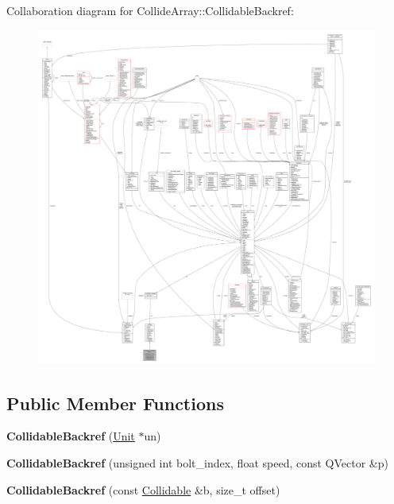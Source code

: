 Collaboration diagram for Collide\+Array\+:\+:Collidable\+Backref\+:
\nopagebreak
\begin{figure}[H]
\begin{center}
\leavevmode
\includegraphics[width=350pt]{dd/ddb/classCollideArray_1_1CollidableBackref__coll__graph}
\end{center}
\end{figure}
\subsection*{Public Member Functions}
\begin{DoxyCompactItemize}
\item 
{\bfseries Collidable\+Backref} (\hyperlink{classUnit}{Unit} $\ast$un)\hypertarget{classCollideArray_1_1CollidableBackref_a3e436b742c4233e417c14222e8cea1c3}{}\label{classCollideArray_1_1CollidableBackref_a3e436b742c4233e417c14222e8cea1c3}

\item 
{\bfseries Collidable\+Backref} (unsigned int bolt\+\_\+index, float speed, const Q\+Vector \&p)\hypertarget{classCollideArray_1_1CollidableBackref_a99de7d4c9f159bdabe5e0b1e3925b83a}{}\label{classCollideArray_1_1CollidableBackref_a99de7d4c9f159bdabe5e0b1e3925b83a}

\item 
{\bfseries Collidable\+Backref} (const \hyperlink{classCollidable}{Collidable} \&b, size\+\_\+t offset)\hypertarget{classCollideArray_1_1CollidableBackref_ab84ff2b90bd21564314a952f7282a539}{}\label{classCollideArray_1_1CollidableBackref_ab84ff2b90bd21564314a952f7282a539}

\end{DoxyCompactItemize}
